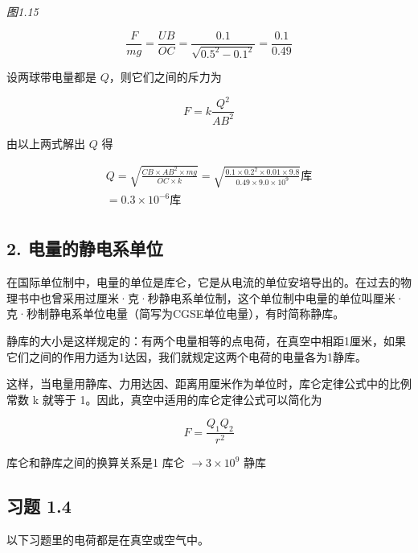 \emph{图1.15}

\[
\frac{F}{m g} = \frac{U B}{O C} = \frac{0.1}{\sqrt{0.5^{2} - 0.1^{2}}} = \frac{0.1}{0.49}
\]

设两球带电量都是 \(Q\)，则它们之间的斥力为

\[
F = k \frac{Q^{2}}{A B^{2}}
\]

由以上两式解出 \(Q\) 得

\[
\begin{array}{l} Q = \sqrt{\frac{CB \times A B^{2} \times m g}{O C \times k}} = \sqrt{\frac{0.1 \times 0.2^{2} \times 0.01 \times 9.8}{0.49 \times 9.0 \times 10^{9}}} \text{库} \\ = 0.3 \times 10^{- 6} \text{库} \\ \end{array}
\]

\subsection{2.
电量的静电系单位}\label{ux7535ux91cfux7684ux9759ux7535ux7cfbux5355ux4f4d}

在国际单位制中，电量的单位是库仑，它是从电流的单位安培导出的。在过去的物理书中也曾采用过厘米·克·秒静电系单位制，这个单位制中电量的单位叫厘米·克·秒制静电系单位电量（简写为CGSE单位电量），有时简称静库。

静库的大小是这样规定的：有两个电量相等的点电荷，在真空中相距1厘米，如果它们之间的作用力适为1达因，我们就规定这两个电荷的电量各为1静库。

这样，当电量用静库、力用达因、距离用厘米作为单位时，库仑定律公式中的比例常数
k 就等于 1。因此，真空中适用的库仑定律公式可以简化为

\[
F = \frac{Q_{1} Q_{2}}{r^{2}}
\]

库仑和静库之间的换算关系是1 库仑 \(\rightarrow 3 \times {10}^{9}\) 静库

\subsection{习题 1.4}\label{ux4e60ux9898-1.4}

以下习题里的电荷都是在真空或空气中。

